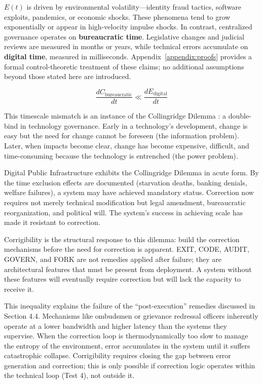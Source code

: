 \documentclass{article}
\begin{document}
$E(t)$ is driven by environmental volatility---identity fraud tactics, software exploits, pandemics, or economic shocks. These phenomena tend to grow exponentially or appear in high-velocity impulse shocks. In contrast, centralized governance operates on \textbf{bureaucratic time}. Legislative changes and judicial reviews are measured in months or years, while technical errors accumulate on \textbf{digital time}, measured in milliseconds. Appendix~\ref{appendix:proofs} provides a formal control-theoretic treatment of these claims; no additional assumptions beyond those stated here are introduced.

\begin{equation}
\frac{dC_{\text{bureaucratic}}}{dt} \ll \frac{dE_{\text{digital}}}{dt}
\end{equation}

This timescale mismatch is an instance of the Collingridge Dilemma \citep{collingridge1980}: a double-bind in technology governance. Early in a technology's development, change is easy but the need for change cannot be foreseen (the information problem). Later, when impacts become clear, change has become expensive, difficult, and time-consuming because the technology is entrenched (the power problem).

Digital Public Infrastructure exhibits the Collingridge Dilemma in acute form. By the time exclusion effects are documented (starvation deaths, banking denials, welfare failures), a system may have achieved mandatory status. Correction now requires not merely technical modification but legal amendment, bureaucratic reorganization, and political will. The system's success in achieving scale has made it resistant to correction.

Corrigibility is the structural response to this dilemma: build the correction mechanisms before the need for correction is apparent. EXIT, CODE, AUDIT, GOVERN, and FORK are not remedies applied after failure; they are architectural features that must be present from deployment. A system without these features will eventually require correction but will lack the capacity to receive it.

This inequality explains the failure of the ``post-execution'' remedies discussed in Section 4.4. Mechanisms like ombudsmen or grievance redressal officers inherently operate at a lower bandwidth and higher latency than the systems they supervise. When the correction loop is thermodynamically too slow to manage the entropy of the environment, error accumulates in the system until it suffers catastrophic collapse. Corrigibility requires closing the gap between error generation and correction; this is only possible if correction logic operates within the technical loop (Test 4), not outside it.
\end{document}
